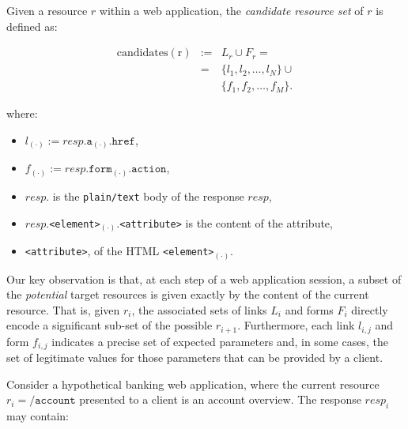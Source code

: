 \begin{definition}
  Given a resource $r$ within a web application, the \emph{candidate resource set} of $r$ is defined as:

  \begin{eqnarray*}
    \mathrm{candidates(r)} & := & L_{r} \cup F_{r} = \\
                           & = & \{l_{1}, l_{2}, \dots, l_{N}\} \cup\\
                           &    & \{f_{1}, f_{2}, \dots, f_{M}\}.
  \end{eqnarray*}

  \noindent where:

  \begin{itemize}

  \item $l_{(\cdot)} := resp.\mathtt{a_{(\cdot)}.href}$,

  \item $f_{(\cdot)} := resp.\mathtt{form_{\mathrm{(\cdot)}}.action}$,

  \item $resp.$ is the \texttt{plain/text} body of the response $resp$,

  \item $resp.$\texttt{<element>}$_{\mathrm{(\cdot)}}.$\texttt{<attribute>}
    is the content of the attribute,

  \item \texttt{<attribute>}, of the \ac{HTML}
    \texttt{<element>}$_{(\cdot)}$.
  \end{itemize}
\end{definition}

Our key observation is that, at each step of a web application session, a subset of the \emph{potential} target resources is given exactly by the content of the current resource.  That is, given $r_i$, the associated sets of links $L_i$ and forms $F_i$ directly encode a significant sub-set of the possible $r_{i+1}$.  Furthermore, each link $l_{i,j}$ and form $f_{i,j}$ indicates a precise set of expected parameters and, in some cases, the set of legitimate values for those parameters that can be provided by a client.

Consider a hypothetical banking web application, where the current resource $r_i=\mathtt{/account}$ presented to a client is an account overview. The response $resp_{i}$ may contain:

